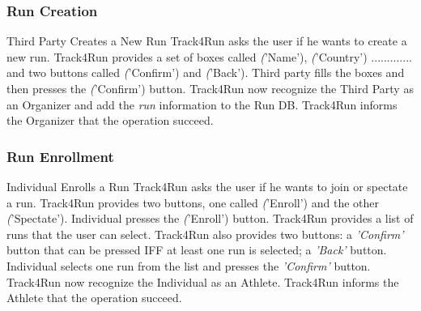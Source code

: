 \documentclass[a4paper]{article}
\begin{document}
        
        \subsubsection{Run Creation}
        
        \begin{usecase}{Third Party Creates a New Run}
              {Track4Run asks the user if he wants to create a new run. Track4Run provides a set of boxes called \textit('Name'), \textit('Country') ............. and two buttons called \textit('Confirm') and \textit('Back').}
              {Third party fills the boxes and then presses the \textit('Confirm') button.}
              {Track4Run now recognize the Third Party as an Organizer and add the \textit{run} information to the Run DB.}
              {Track4Run informs the Organizer that the operation succeed.}
        \end{usecase}
        
        
        
        \subsubsection{Run Enrollment}
        
        \begin{usecase}{Individual Enrolls a Run}
              {Track4Run asks the user if he wants to join or spectate a run. Track4Run provides two buttons, one called \textit('Enroll') and the other \textit('Spectate').}
              {Individual presses the \textit('Enroll') button.}
              {Track4Run provides a list of runs that the user can select. Track4Run also provides two buttons: a \textit{'Confirm'} button that can be pressed IFF at least one run is selected; a \textit{'Back'} button.}
              {Individual selects one run from the list and presses the \textit{'Confirm'} button.}
              {Track4Run now recognize the Individual as an Athlete.}
              {Track4Run informs the Athlete that the operation succeed.}
        \end{usecase}
        
\end{document}
